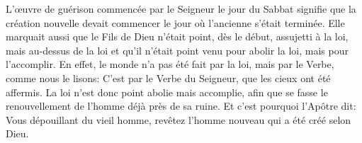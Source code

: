 L’œuvre de guérison commencée par le Seigneur le jour du Sabbat
	signifie que la création nouvelle devait commencer
	le jour où l’ancienne s’était terminée.
Elle marquait aussi que le Fils de Dieu n’était point, dès le début,
	assujetti à la loi, mais au-dessus de la loi
	et qu’il n’était point venu pour abolir la loi, mais pour l’accomplir.
En effet, le monde n’a pas été fait par la loi, mais par le Verbe,
	comme nous le lisons:
	C’est par le Verbe du Seigneur, que les cieux ont été affermis.
La loi n’est donc point abolie mais accomplie,
	afin que se fasse le renouvellement de l’homme déjà près de sa ruine.
Et c’est pourquoi l’Apôtre dit:
	Vous dépouillant du vieil homme, revêtez l’homme nouveau
		qui a été créé selon Dieu.
